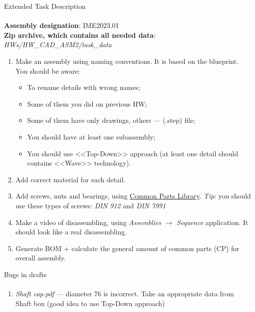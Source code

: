 \documentclass[aspectratio=169]{beamer}
\begin{document}
\begin{frame}[t]{Extended Task Description}
\framesubtitle{}
\vspace{-0.4cm}
\footnotesize
    \textbf{Assembly designation}: IME2023.01 \\ 
    \textbf{Zip archive, which contains all needed data}: \textit{HWs/HW\_CAD\_ASM2/task\_data}
    \vspace{-0.25cm}
    \begin{enumerate}
        \item Make an assembly using naming conventions. It is based on the blueprint. You should be aware:
        \begin{itemize}
            \footnotesize
            \item To rename details with wrong names;
            \item Some of them you did on previous HW;
            \item Some of them have only drawings, others --- (.step) file;
            \item You should have at least one subassembly;
            \item You should use <<Top-Down>> approach (at least one detail should contains <<Wave>> technology).
        \end{itemize}
        \item Add correct material for each detail.
        \item Add screws, nuts and bearings, using \href{https://www.mcmaster.com/}{Common Parts Library}. \textit{Tip}: you should use these types of screws: \textit{DIN 912} and \textit{DIN 7991}
        \item Make a video of disassembling, using \textit{Assemblies $\rightarrow$ Sequence} application. It should look like a real disassembling.
        \item Generate BOM + calculate the general amount of common parts (CP) for overall assembly.
    \end{enumerate}
\end{frame}

\begin{frame}[t]{Bugs in drafts}
\framesubtitle{}
    \begin{enumerate}
        \item \textit{Shaft cap.pdf} --- diameter 76 is incorrect. Take an appropriate data from Shaft box (good idea to use Top-Down approach)
    \end{enumerate}
\end{frame}
\end{document}
